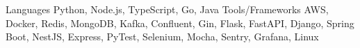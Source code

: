 \begin{cvskills}
  \cvskill
  {Languages}
  {Python, Node.js, TypeScript, Go, Java}
  \cvskill
  {Tools/Frameworks}
  {AWS, Docker, Redis, MongoDB, Kafka, Confluent, Gin, Flask, FastAPI, Django, Spring Boot, NestJS, Express, PyTest, Selenium, Mocha, Sentry, Grafana, Linux}
\end{cvskills}